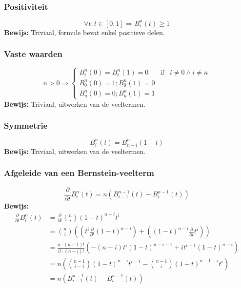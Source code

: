 \documentclass[a4paper,titlepage]{article}
\begin{document}
\subsubsection{Positiviteit}
\begin{equation}
\forall t:t\in\left[0,1\right]\Rightarrow B_i^n\left(t\right)\geq1
\end{equation}
\textbf{Bewijs:} Triviaal, formule bevat enkel positieve delen.
\subsubsection{Vaste waarden}
\begin{equation}
n>0\Rightarrow\left\{
\begin{array}{lcr}
B_i^n\left(0\right)=B_i^n\left(1\right)=0&\mbox{if}&i\neq0\wedge i\neq n\\
B_0^n\left(0\right)=1;B_0^n\left(1\right)=0&&\\
B_n^n\left(0\right)=0;B_n^n\left(1\right)=1&&
\end{array}
\right.
\end{equation}
\textbf{Bewijs:} Triviaal, uitwerken van de veeltermen.
\subsubsection{Symmetrie}
\begin{equation}
B_i^n\left(t\right)=B_{n-i}^n\left(1-t\right)
\end{equation}
\textbf{Bewijs:} Triviaal, uitwerken van de veeltermen.
\subsubsection{Afgeleide van een Bernstein-veelterm}
\label{subsec:derivBern}
\begin{equation}
\displaystyle\frac{\partial}{\partial t}B_i^n\left(t\right)=n\left(B_{i-1}^{n-1}\left(t\right)-B_{i}^{n-1}\left(t\right)\right)
\end{equation}
\textbf{Bewijs:}
\begin{equation}
\begin{array}{rl}
\displaystyle\frac{\partial}{\partial t}B_i^n\left(t\right)&=\displaystyle\frac{\partial}{\partial t}\binom{n}{i}\left(1-t\right)^{n-i}t^i
\\&=\binom{n}{i}\left(\left(t^i\displaystyle\frac{\partial}{\partial t}\left(1-t\right)^{n-i}\right)+\left(\left(1-t\right)^{n-i}\displaystyle\frac{\partial}{\partial t}t^i\right)\right)
\\&=\displaystyle\frac{n\cdot\left(n-1\right)!}{i!\cdot\left(n-i\right)!}\left(-\left(n-i\right)t^i\left(1-t\right)^{n-i-1}+it^{i-1}\left(1-t\right)^{n-i}\right)
\\&=n\left(\binom{n-1}{i-1}\left(1-t\right)^{n-i}t^{i-1}-\binom{n-1}{i}\left(1-t\right)^{n-1-i}t^i\right)
\\&=n\left(B_{i-1}^{n-1}\left(t\right)-B_i^{n-1}\left(t\right)\right)
\end{array}
\end{equation}
\end{document}
